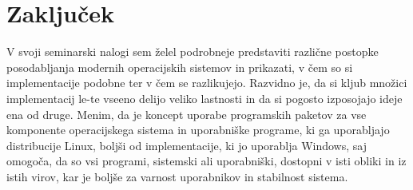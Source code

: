 \section{Zaključek}

V svoji seminarski nalogi sem želel podrobneje predstaviti različne postopke posodabljanja modernih operacijskih sistemov
in prikazati, v čem so si implementacije podobne ter v čem se razlikujejo.
Razvidno je, da si kljub množici implementacij le-te vseeno delijo veliko lastnosti in da si pogosto izposojajo
ideje ena od druge.
Menim, da je koncept uporabe programskih paketov za vse komponente operacijskega sistema in uporabniške programe,
ki ga uporabljajo distribucije Linux, boljši od implementacije, ki jo uporablja Windows, saj omogoča, da so vsi
programi, sistemski ali uporabniški, dostopni v isti obliki in iz istih virov, kar je boljše za varnost uporabnikov in
stabilnost sistema.